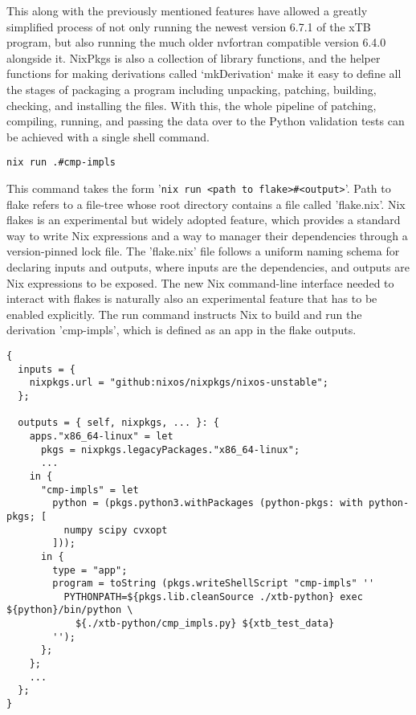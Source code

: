 This along with the previously mentioned features have allowed a greatly simplified process of not only running the newest version 6.7.1 of the xTB program, but also running the much older nvfortran compatible version 6.4.0 alongside it.
NixPkgs is also a collection of library functions, and the helper functions for making derivations called `mkDerivation` make it easy to define all the stages of packaging a program including unpacking, patching, building, checking, and installing the files.
With this, the whole pipeline of patching, compiling, running, and passing the data over to the Python validation tests can be achieved with a single shell command.

\begin{verbatim}
nix run .#cmp-impls
\end{verbatim}


This command takes the form '\verb|nix run <path to flake>#<output>|'. Path to flake refers to a file-tree whose root directory contains a file called 'flake.nix'. Nix flakes is an experimental but widely adopted feature, which provides a standard way to write Nix expressions and a way to manager their dependencies through a version-pinned lock file. The 'flake.nix' file follows a uniform naming schema for declaring inputs and outputs, where inputs are the dependencies, and outputs are Nix expressions to be exposed.
The new Nix command-line interface needed to interact with flakes is naturally also an experimental feature that has to be enabled explicitly. The run command instructs Nix to build and run the derivation 'cmp-impls', which is defined as an app in the flake outputs.

\newpage

\begin{verbatim}
{
  inputs = {
    nixpkgs.url = "github:nixos/nixpkgs/nixos-unstable";
  };

  outputs = { self, nixpkgs, ... }: {
    apps."x86_64-linux" = let
      pkgs = nixpkgs.legacyPackages."x86_64-linux";
      ...
    in {
      "cmp-impls" = let
        python = (pkgs.python3.withPackages (python-pkgs: with python-pkgs; [
          numpy scipy cvxopt
        ]));
      in {
        type = "app";
        program = toString (pkgs.writeShellScript "cmp-impls" ''
          PYTHONPATH=${pkgs.lib.cleanSource ./xtb-python} exec ${python}/bin/python \
            ${./xtb-python/cmp_impls.py} ${xtb_test_data}
        '');
      };
    };
    ...
  };
}
\end{verbatim}

